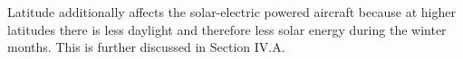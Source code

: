 Latitude additionally affects the solar-electric powered aircraft because at higher latitudes there is less daylight and therefore less solar energy during the winter months. This is further discussed in Section IV.A.

% 
% 
% 
% 

